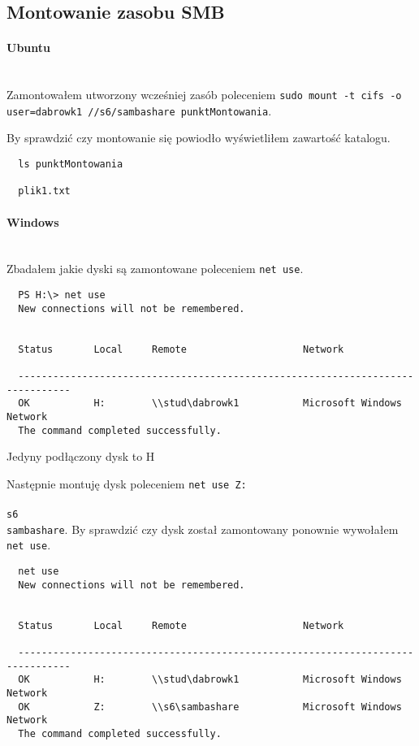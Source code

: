 \documentclass{article} %
\begin{document}
\subsection{Montowanie zasobu SMB}
\paragraph{Ubuntu} \mbox{} \\
Zamontowałem utworzony wcześniej zasób poleceniem \texttt{sudo mount -t cifs -o user=dabrowk1 //s6/sambashare punktMontowania}.

By sprawdzić czy montowanie się powiodło wyświetliłem zawartość katalogu.
\begin{verbatim}
  ls punktMontowania 

  plik1.txt
\end{verbatim}

\paragraph{Windows} \mbox{} \\
Zbadałem jakie dyski są zamontowane poleceniem \texttt{net use}.
\begin{verbatim}
  PS H:\> net use
  New connections will not be remembered.


  Status       Local     Remote                    Network

  -------------------------------------------------------------------------------
  OK           H:        \\stud\dabrowk1           Microsoft Windows Network
  The command completed successfully.
\end{verbatim}
Jedyny podłączony dysk to H

Następnie montuję dysk poleceniem \texttt{net use Z: \\\\s6\\sambashare}.
By sprawdzić czy dysk został zamontowany ponownie wywołałem \texttt{net use}.
\begin{verbatim}
  net use
  New connections will not be remembered.


  Status       Local     Remote                    Network

  -------------------------------------------------------------------------------
  OK           H:        \\stud\dabrowk1           Microsoft Windows Network
  OK           Z:        \\s6\sambashare           Microsoft Windows Network
  The command completed successfully.
\end{verbatim}
\end{document}
